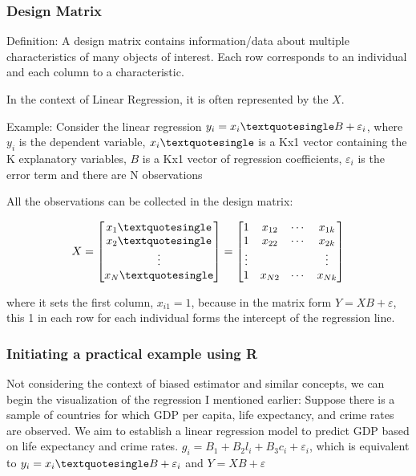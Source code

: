 \documentclass{article} %
\begin{document}
\subsubsection{Design Matrix}
Definition: A design matrix contains information/data about multiple characteristics of many objects of interest. 
Each row corresponds to an individual and each column to a characteristic.

In the context of Linear Regression, it is often represented by the \(X\).

Example: Consider the linear regression \(y_i = x_i\textquotesingle B + \varepsilon_i\), where \(y_i\) is the dependent variable, \(x_i\textquotesingle\) is a Kx1 vector containing the K explanatory variables, \(B\) is a Kx1 vector of regression coefficients, \(\varepsilon_i\) is the error term and there are N observations

All the observations can be collected in the design matrix:


\[X = \begin{bmatrix} x_1\textquotesingle\\x_2\textquotesingle\\\vdots\\x_N\textquotesingle\end{bmatrix} = \begin{bmatrix}
1 & x_{12} & \cdots & x_{1k} \\
1 & x_{22} & \cdots & x_{2k} \\
\vdots & & & \vdots \\
1 & x_{N2} & \cdots & x_{Nk}
\end{bmatrix}\]

where it sets the first column, \(x_{i1} = 1\), because in the matrix form \(Y = XB + \varepsilon\), this 1 in each row for each individual forms the intercept of the regression line.

\subsubsection{Initiating a practical example using R}
Not considering the context of biased estimator and similar concepts, we can begin the visualization of the regression I mentioned earlier:
Suppose there is a sample of countries for which GDP per capita, life expectancy, and crime rates are observed. We aim to establish a linear regression model to predict GDP based on life expectancy and crime rates.
\(g_i = B_1 + B_2l_i + B_3c_i + \varepsilon_i \), which is equivalent to \(y_i = x_i\textquotesingle B + \varepsilon_i\) and \(Y = XB + \varepsilon\)
\end{document}
